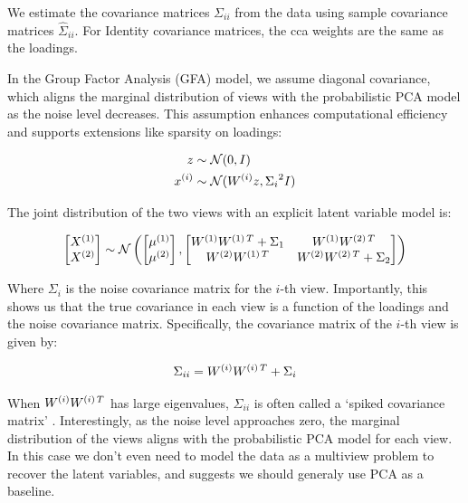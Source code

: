 We estimate the covariance matrices \(\Sigma_{ii}\) from the data using sample covariance matrices \(\hat{\Sigma}_{ii}\). For Identity covariance matrices, the \acrshort{cca} weights are the same as the loadings.

In the Group Factor Analysis (GFA) model, we assume diagonal covariance, which aligns the marginal distribution of views with the probabilistic PCA model as the noise level decreases. This assumption enhances computational efficiency and supports extensions like sparsity on loadings:

\begin{align}
    z &\sim \mathcal{N}(0, I)\\
    x^{(i)} &\sim \mathcal{N}(W^{(i)} z, {\Sigma_{i}}^{2}I)
\end{align}

The joint distribution of the two views with an explicit latent variable model is:

\begin{align}
    \begin{bmatrix}
        X^{(1)} \\ X^{(2)}
    \end{bmatrix} \sim \mathcal{N} \left( \begin{bmatrix}
                                              \mu^{(1)} \\ \mu^{(2)}
    \end{bmatrix}, \begin{bmatrix}
                       W^{(1)}W^{(1)\,T} + \Sigma_1 & W^{(1)}W^{(2)\,T} \\ W^{(2)}W^{(1)\,T} & W^{(2)}W^{(2)\,T} + \Sigma_2
    \end{bmatrix} \right)
\end{align}

Where \(\Sigma_{i}\) is the noise covariance matrix for the \(i\)-th view.
Importantly, this shows us that the true covariance in each view is a function of the loadings and the noise covariance matrix. Specifically, the covariance matrix of the \(i\)-th view is given by:

\begin{align}
    \Sigma_{ii} = W^{(i)}W^{(i)\,T} + \Sigma_{i}
\end{align}

When $W^{(i)}W^{(i)\,T}$ has large eigenvalues, $\Sigma_{ii}$ is often called a `spiked covariance matrix' \citep{johnstone2001distribution}.
Interestingly, as the noise level approaches zero, the marginal distribution of the views aligns with the probabilistic PCA model for each view.
In this case we don't even need to model the data as a multiview problem to recover the latent variables, and suggests we should generaly use PCA as a baseline.

